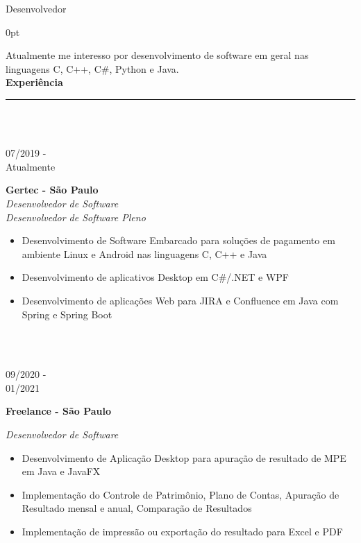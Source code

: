 \documentclass[a4paper]{article}
\begin{document}
\LARGE Desenvolvedor
\vspace{12.5pt}
\begin{adjustwidth}{\parindent}{0pt}
\begin{minipage}[t]{0.65\textwidth}
\large Atualmente me interesso por desenvolvimento de software em geral nas linguagens C, C++, C\#, Python e Java.\\

\Large{\textbf{Experiência}} \normalsize \\ \rule{\textwidth}{0.5pt} \\ \\

\begin{minipage}[t]{0.2\textwidth}
\large{07/2019 - \\ Atualmente}
\end{minipage}
\begin{minipage}[t]{0.8\textwidth}
{
  \setlength{\parskip}{5.5pt}
  \Large{\textbf{Gertec - São Paulo}} \\
  \large{\textit{Desenvolvedor de Software}} \\
  \large{\textit{Desenvolvedor de Software Pleno}}
  \begin{itemize}
    \item \normalsize{Desenvolvimento de Software Embarcado para soluções de pagamento em ambiente Linux e Android nas linguagens C, C++ e Java}
    \item \normalsize{Desenvolvimento de aplicativos Desktop em C\#/.NET e WPF}
    \item \normalsize{Desenvolvimento de aplicações Web para JIRA e Confluence em Java com Spring e Spring Boot}
  \end{itemize}
}
\end{minipage} \\ \\

\begin{minipage}[t]{0.2\textwidth}
  \large{09/2020 - \\ 01/2021}
  \end{minipage}
  \begin{minipage}[t]{0.8\textwidth}
  {
    \setlength{\parskip}{5.5pt}
    \Large{\textbf{Freelance - São Paulo}}
  
    \large{\textit{Desenvolvedor de Software}}
    \begin{itemize}
      \item \normalsize{Desenvolvimento de Aplicação Desktop para apuração de resultado de MPE em Java e JavaFX}
      \item \normalsize{Implementação do Controle de Patrimônio, Plano de Contas, Apuração de Resultado mensal e anual, Comparação de Resultados}
      \item \normalsize{Implementação de impressão ou exportação do resultado para Excel e PDF}
    \end{itemize}
  }
  \end{minipage} \\ \\


\end{minipage}
\end{adjustwidth}
\end{document}
